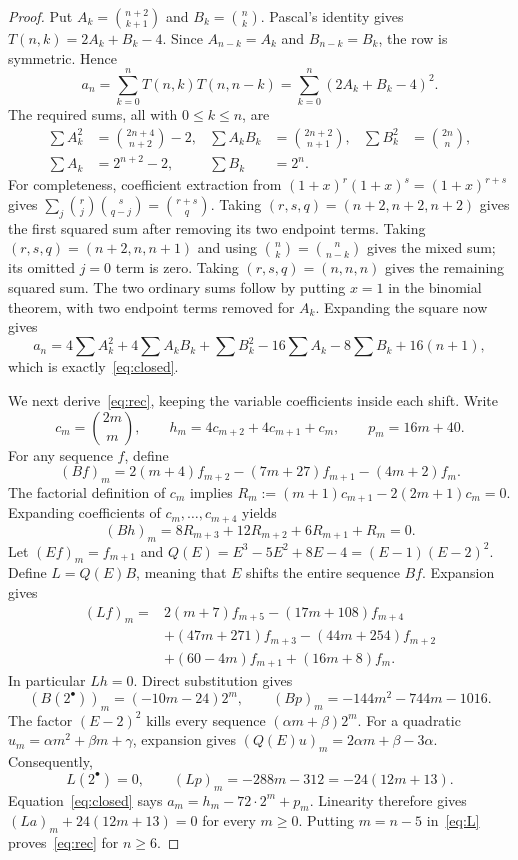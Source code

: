 \documentclass[11pt]{article}
\newcommand{\bin}[2]{\binom{#1}{#2}}
\begin{document}
\begin{proof}
Put $A_k=\bin{n+2}{k+1}$ and $B_k=\bin nk$. Pascal's identity gives
$T(n,k)=2A_k+B_k-4$. Since $A_{n-k}=A_k$ and $B_{n-k}=B_k$,
the row is symmetric. Hence
\[
a_n=\sum_{k=0}^n T(n,k)T(n,n-k)=\sum_{k=0}^n(2A_k+B_k-4)^2.
\]
The required sums, all with $0\leq k\leq n$, are
\begin{align*}
\sum A_k^2&=\bin{2n+4}{n+2}-2,&
\sum A_kB_k&=\bin{2n+2}{n+1},&
\sum B_k^2&=\bin{2n}{n},\\
\sum A_k&=2^{n+2}-2,&\sum B_k&=2^n.
\end{align*}
For completeness, coefficient extraction from
$(1+x)^r(1+x)^s=(1+x)^{r+s}$ gives
$\sum_j\bin rj\bin s{q-j}=\bin{r+s}q$.
Taking $(r,s,q)=(n+2,n+2,n+2)$ gives the first squared sum after
removing its two endpoint terms. Taking $(r,s,q)=(n+2,n,n+1)$
and using $\bin nk=\bin n{n-k}$ gives the mixed sum; its omitted
$j=0$ term is zero. Taking $(r,s,q)=(n,n,n)$ gives the remaining
squared sum. The two ordinary sums follow by putting $x=1$ in the
binomial theorem, with two endpoint terms removed for $A_k$.
Expanding the square now gives
\[
a_n=4\sum A_k^2+4\sum A_kB_k+\sum B_k^2
       -16\sum A_k-8\sum B_k+16(n+1),
\]
which is exactly~\eqref{eq:closed}.

We next derive~\eqref{eq:rec}, keeping the variable coefficients inside
each shift. Write
\[
c_m=\bin{2m}m,\qquad h_m=4c_{m+2}+4c_{m+1}+c_m,
\qquad p_m=16m+40.
\]
For any sequence $f$, define
\[
(Bf)_m=2(m+4)f_{m+2}-(7m+27)f_{m+1}-(4m+2)f_m.
\]
The factorial definition of $c_m$ implies
$R_m:=(m+1)c_{m+1}-2(2m+1)c_m=0$.
Expanding coefficients of $c_m,\ldots,c_{m+4}$ yields
\[
(Bh)_m=8R_{m+3}+12R_{m+2}+6R_{m+1}+R_m=0.
\]
Let $(Ef)_m=f_{m+1}$ and $Q(E)=E^3-5E^2+8E-4=(E-1)(E-2)^2$.
Define $L=Q(E)B$, meaning that $E$ shifts the entire sequence $Bf$.
Expansion gives
\begin{equation}\label{eq:L}
\begin{aligned}
(Lf)_m={}&2(m+7)f_{m+5}-(17m+108)f_{m+4}\\
 &+(47m+271)f_{m+3}-(44m+254)f_{m+2}\\
 &+(60-4m)f_{m+1}+(16m+8)f_m.
\end{aligned}
\end{equation}
In particular $Lh=0$. Direct substitution gives
\[
(B(2^{\bullet}))_m=(-10m-24)2^m,\qquad
(Bp)_m=-144m^2-744m-1016.
\]
The factor $(E-2)^2$ kills every sequence $(\alpha m+\beta)2^m$.
For a quadratic $u_m=\alpha m^2+\beta m+\gamma$, expansion gives
$(Q(E)u)_m=2\alpha m+\beta-3\alpha$.
Consequently,
\[
L(2^{\bullet})=0,\qquad (Lp)_m=-288m-312=-24(12m+13).
\]
Equation~\eqref{eq:closed} says $a_m=h_m-72\cdot2^m+p_m$.
Linearity therefore gives $(La)_m+24(12m+13)=0$ for every $m\geq0$.
Putting $m=n-5$ in~\eqref{eq:L} proves~\eqref{eq:rec} for $n\geq6$.
\end{proof}
\end{document}
